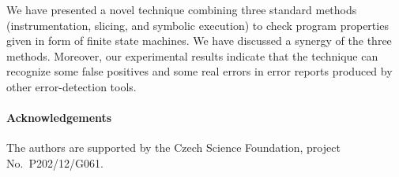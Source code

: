 \documentclass[10pt]{llncs}
\begin{document}
We have presented a novel technique combining three standard methods
(instrumentation, slicing, and symbolic execution) to check program
properties given in form of finite state machines. We have discussed a
synergy of the three methods. Moreover, our experimental results indicate
that the technique can recognize some false positives and some real errors
in error reports produced by other error-detection tools.

\paragraph{Acknowledgements}
\label{sec:acknowledgements}

The authors are supported by the Czech Science Foundation,
project No.~P202/12/G061.




\end{document}
